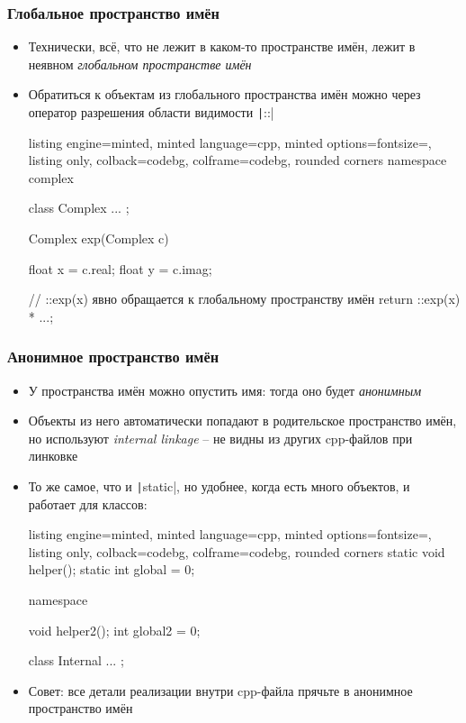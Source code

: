 \documentclass[10pt]{beamer}
\begin{document}
\begin{frame}[fragile]
\frametitle{Глобальное пространство имён}
\begin{itemize}
\item Технически, всё, что не лежит в каком-то пространстве имён, лежит в неявном \textit{глобальном пространстве имён}
\pause
\item Обратиться к объектам из глобального пространства имён можно через оператор разрешения области видимости \texttt|::|
\begin{tcblisting}{listing engine=minted, minted language=cpp, minted options={fontsize=\scriptsize}, listing only, colback=codebg, colframe=codebg, rounded corners}
namespace complex {
  class Complex { ... };

  Complex exp(Complex c) {
    float x = c.real;
    float y = c.imag;

    // ::exp(x) явно обращается к глобальному пространству имён
    return ::exp(x) * ...;
  }
}
\end{tcblisting}
\end{itemize}
\end{frame}

\begin{frame}[fragile]
\frametitle{Анонимное пространство имён}
\begin{itemize}
\item У пространства имён можно опустить имя: тогда оно будет \textit{анонимным}
\pause
\item Объекты из него автоматически попадают в родительское пространство имён, но используют \textit{internal linkage} -- не видны из других cpp-файлов при линковке
\pause
\item То же самое, что и \texttt|static|, но удобнее, когда есть много объектов, и работает для классов:
\begin{tcblisting}{listing engine=minted, minted language=cpp, minted options={fontsize=\scriptsize}, listing only, colback=codebg, colframe=codebg, rounded corners}
static void helper();
static int global = 0;

namespace {
  void helper2();
  int global2 = 0;

  class Internal { ... };
}
\end{tcblisting}
\pause
{}
\item Совет: все детали реализации внутри cpp-файла прячьте в анонимное пространство имён
\end{itemize}
\end{frame}
\end{document}
